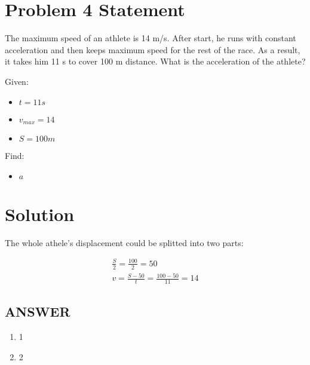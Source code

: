 \section*{Problem 4 Statement}

The maximum speed of an athlete is 14 m/s. After start, he runs with constant acceleration and
then keeps maximum speed for the rest of the race. As a result, it takes him 11 s to cover 100 m
distance. What is the acceleration of the athlete?

\bigbreak Given:

\begin{itemize}
    \item $t = 11s$
    \item $v_{max} = 14$
    \item $S = 100m$
\end{itemize}

\bigbreak Find:

\begin{itemize}
    \item $a$
\end{itemize}

\section*{Solution}

The whole athele's displacement could be splitted into two parts:

\begin{align*}
    \frac{S}{2} = \frac{100}{2} = 50\\
    v = \frac{S - 50}{t} = \frac{100 - 50}{11} = 14

\end{align*}

\subsection*{ANSWER}
\begin{enumerate}
    \item 1
    \item 2
\end{enumerate}